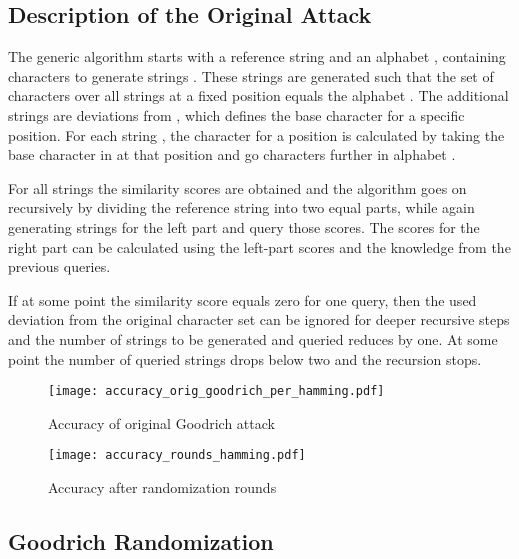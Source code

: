 \documentclass{llncs}
\begin{document}
\subsection{Description of the Original Attack}
\label{sec:goodDescr}

The generic algorithm starts with a reference string 
and an alphabet , containing  characters to
generate  strings . These strings are generated such that the set of characters over all strings  at a fixed position equals the alphabet . The additional strings   are deviations from , which defines the base
character for a specific position. For each string  , the character for a position is calculated by taking the base character in
 at that position and go  characters further in alphabet .

For all strings   the  similarity scores are obtained and
the algorithm goes on recursively by dividing the reference string into two equal parts, while
again generating  strings for the left part and query those  scores.
The scores for the right part can be calculated using the left-part scores and
the knowledge from the previous queries.

If at some point the similarity score equals zero for one query, then the used
deviation from the original character set can be ignored for deeper recursive
steps and the number of strings to be generated and queried reduces by one. At
some point the number of queried strings drops below two and the recursion
stops.



\begin{figure*}
        \centering
        \begin{minipage}[b]{0.45\textwidth}
                \centering
                \texttt{[image: accuracy\_orig\_goodrich\_per\_hamming.pdf]}
                \caption{Accuracy of original Goodrich attack}\label{fig:origAttack}
        \end{minipage}\hspace{12pt} \begin{minipage}[b]{0.45\textwidth}
                \centering
                \texttt{[image: accuracy\_rounds\_hamming.pdf]}
                \caption{Accuracy after randomization rounds}
                \label{fig:randAttack}
        \end{minipage}
\end{figure*}

\subsection{Goodrich Randomization}
\label{sec:goodRand}
\end{document}
